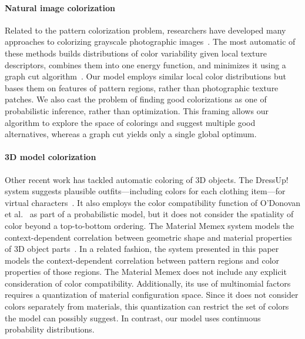 \paragraph{Natural image colorization}
Related to the pattern colorization problem, researchers have developed many approaches to colorizing grayscale photographic images~\cite{ScribbleColorization,TransferColorization}. The most automatic of these methods builds distributions of color variability given local texture descriptors, combines them into one energy function, and minimizes it using a graph cut algorithm~\cite{MultimodalColorization}. Our model employs similar local color distributions but bases them on features of pattern regions, rather than photographic texture patches. We also cast the problem of finding good colorizations as one of probabilistic inference, rather than optimization. This framing allows our algorithm to explore the space of colorings and suggest multiple good alternatives, whereas a graph cut yields only a single global optimum.

\paragraph{3D model colorization}
Other recent work has tackled automatic coloring of 3D objects. The DressUp! system suggests plausible outfits---including colors for each clothing item---for virtual characters~\cite{DressUp}. It also employs the color compatibility function of O'Donovan et al.~ as part of a probabilistic model, but it does not consider the spatiality of color beyond a top-to-bottom ordering. The Material Memex system models the context-dependent correlation between geometric shape and material properties of 3D object parts~\cite{MaterialMemex}. In a related fashion, the system presented in this paper models the context-dependent correlation between pattern regions and color properties of those regions. The Material Memex does not include any explicit consideration of color compatibility. Additionally, its use of multinomial factors requires a quantization of material configuration space. Since it does not consider colors separately from materials, this quantization can restrict the set of colors the model can possibly suggest. In contrast, our model uses continuous probability distributions.